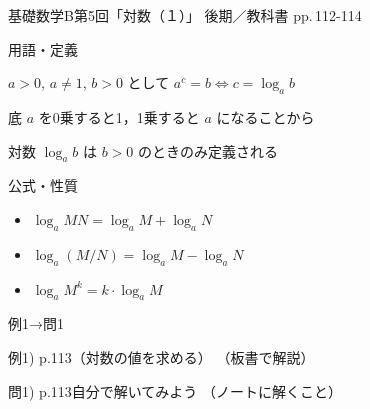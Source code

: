 \documentclass[aspectratio=43,professionalfonts,handout]{beamer}
\newcommand{\LectureNum}{5}
\newcommand{\LectureTitle}{対数（１）}
\newcommand{\TextPages}{pp.\,112-114}
\newcommand{\CourseName}{基礎数学B}
\renewcommand{\TermName}{後期}
\begin{document}
\begin{frame}{\CourseName\quad 第\LectureNum 回「\LectureTitle 」}
  {\small \TermName\quad \TeacherName\quad ／\quad 教科書 \TextPages}

  \begin{block}{用語・定義}
  \begin{description}[labelwidth=5.5em]
    \item[\kw{対数の定義：$\log_a b = c \Leftrightarrow a^c = b$}] $a > 0$, $a \neq 1$, $b > 0$ として $a^c = b \Leftrightarrow c = \log_a b$
    \item[\kw{$\log_a 1 = 0$、$\log_a a = 1$}] 底 $a$ を0乗すると1，1乗すると $a$ になることから
    \item[\kw{真数条件：$b > 0$、底の条件：$a > 0$, $a \neq 1$}] 対数 $\log_a b$ は $b > 0$ のときのみ定義される
  \end{description}
  \end{block}
\end{frame}

\begin{frame}{公式・性質}
  \begin{block}{}
  \begin{itemize}
    \item $\log_a MN = \log_a M + \log_a N$
    \item $\log_a (M/N) = \log_a M - \log_a N$
    \item $\log_a M^k = k \cdot \log_a M$
  \end{itemize}
  \end{block}
\end{frame}

\begin{frame}{例1→問1}
  \begin{exampleblock}{例1) p.113（対数の値を求める）}
    （板書で解説）
  \end{exampleblock}

  \vfill

  \begin{block}{問1) p.113\quad 自分で解いてみよう}
    （ノートに解くこと）
  \end{block}
\end{frame}
\end{document}
